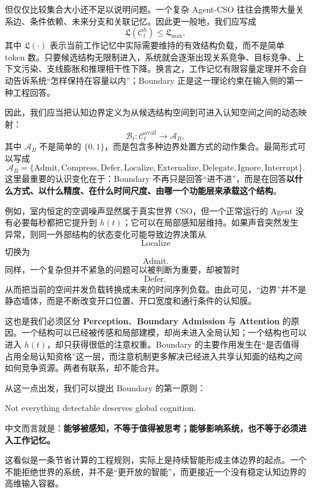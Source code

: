 但仅仅比较集合大小还不足以说明问题。一个复杂 Agent-CSO 往往会携带大量关系边、条件依赖、未来分支和关联记忆。因此更一般地，我们应写成
\[
\mathfrak{L}
\left(
\mathcal{C}^{h}_t
\right)
\leq
\mathfrak{L}_{\max},
\]
其中 $\mathfrak{L}(\cdot)$ 表示当前工作记忆中实际需要维持的有效结构负载，而不是简单 token 数。只要候选结构无限制进入，系统就会逐渐出现关系竞争、目标竞争、上下文污染、支线膨胀和推理相干性下降。换言之，工作记忆有限容量定理并不会自动告诉系统“怎样保持在容量以内”；Boundary 正是这一理论约束在输入侧的第一种工程回答。

因此，我们应当把认知边界定义为从候选结构空间到可进入认知空间之间的动态映射：
\[
\mathcal{B}_t:
\mathcal{C}^{\mathrm{avail}}_t
\longrightarrow
\mathcal{A}_{B},
\]
其中 $\mathcal{A}_{B}$ 不是简单的 $\{0,1\}$，而是包含多种边界处置方式的动作集合。最简形式可以写成
\[
\mathcal{A}_{B}
=
\{
\mathrm{Admit},
\mathrm{Compress},
\mathrm{Defer},
\mathrm{Localize},
\mathrm{Externalize},
\mathrm{Delegate},
\mathrm{Ignore},
\mathrm{Interrupt}
\}.
\]
这里最重要的认识变化在于：Boundary 不再只是回答“进不进”，而是在回答\textbf{以什么方式、以什么精度、在什么时间尺度、由哪一个功能层来承载这个结构}。

例如，室内恒定的空调噪声显然属于真实世界 CSO，但一个正常运行的 Agent 没有必要每秒都把它提升到 $h(t)$；它可以在局部感知层维持。如果声音突然发生异常，则同一外部结构的状态变化可能导致边界决策从
\[
\mathrm{Localize}
\]
切换为
\[
\mathrm{Admit}.
\]
同样，一个复杂但并不紧急的问题可以被判断为重要，却被暂时
\[
\mathrm{Defer},
\]
从而把当前的空间并发负载转换成未来的时间序列负载。由此可见，“边界”并不是静态墙体，而是不断改变开口位置、开口宽度和通行条件的认知膜。

这也是我们必须区分 \textbf{Perception}、\textbf{Boundary Admission} 与 \textbf{Attention} 的原因。一个结构可以已经被传感和局部建模，却尚未进入全局认知；一个结构也可以进入 $h(t)$，却只获得很低的注意权重。Boundary 的主要作用发生在“是否值得占用全局认知资格”这一层，而注意机制更多解决已经进入共享认知面的结构之间如何竞争资源。两者有联系，却不能合并。

从这一点出发，我们可以提出 Boundary 的第一原则：
\begin{proposition*}
Not everything detectable deserves global cognition.
\end{proposition*}
中文而言就是：\textbf{能够被感知，不等于值得被思考；能够影响系统，也不等于必须进入工作记忆。}

这看似是一条节省计算的工程规则，实际上是持续智能形成主体边界的起点。一个不能拒绝世界的系统，并不是“更开放的智能”，而更接近一个没有稳定认知边界的高维输入容器。


